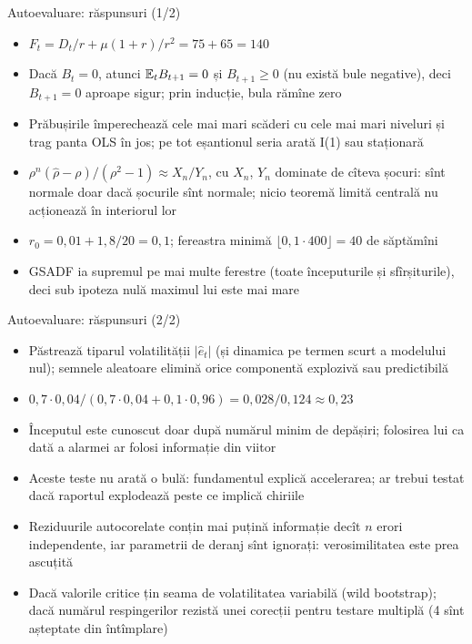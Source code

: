 \begin{frame}{Autoevaluare: răspunsuri (1/2)}
\itemsize{\small}
\begin{itemize}
    \item $F_t = D_t/r + \mu(1 + r)/r^2 = 75 + 65 = 140$
    \item Dacă $B_t = 0$, atunci $\mathbb{E}_t B_{t+1} = 0$ și $B_{t+1} \ge 0$ (nu există bule negative), deci $B_{t+1} = 0$ aproape sigur; prin inducție, bula rămîne zero
    \item Prăbușirile împerechează cele mai mari scăderi cu cele mai mari niveluri și trag panta OLS în jos; pe tot eșantionul seria arată I(1) sau staționară
    \item $\rho^n(\hat\rho - \rho)/(\rho^2 - 1) \approx X_n/Y_n$, cu $X_n$, $Y_n$ dominate de cîteva șocuri: sînt normale doar dacă șocurile sînt normale; nicio teoremă limită centrală nu acționează în interiorul lor
    \item $r_0 = 0{,}01 + 1{,}8/20 = 0{,}1$; fereastra minimă $\lfloor 0{,}1 \cdot 400\rfloor = 40$ de săptămîni
    \item GSADF ia supremul pe mai multe ferestre (toate începuturile și sfîrșiturile), deci sub ipoteza nulă maximul lui este mai mare
\end{itemize}
\end{frame}

\begin{frame}{Autoevaluare: răspunsuri (2/2)}
\itemsize{\small}
\begin{itemize}
    \item Păstrează tiparul volatilității $|\hat e_t|$ (și dinamica pe termen scurt a modelului nul); semnele aleatoare elimină orice componentă explozivă sau predictibilă
    \item $0{,}7 \cdot 0{,}04/(0{,}7 \cdot 0{,}04 + 0{,}1 \cdot 0{,}96) = 0{,}028/0{,}124 \approx 0{,}23$
    \item Începutul este cunoscut doar după numărul minim de depășiri; folosirea lui ca dată a alarmei ar folosi informație din viitor
    \item Aceste teste nu arată o bulă: fundamentul explică accelerarea; ar trebui testat dacă raportul explodează peste ce implică chiriile
    \item Reziduurile autocorelate conțin mai puțină informație decît $n$ erori independente, iar parametrii de deranj sînt ignorați: verosimilitatea este prea ascuțită
    \item Dacă valorile critice țin seama de volatilitatea variabilă (wild bootstrap); dacă numărul respingerilor rezistă unei corecții pentru testare multiplă (4 sînt așteptate din întîmplare)
\end{itemize}
\end{frame}

